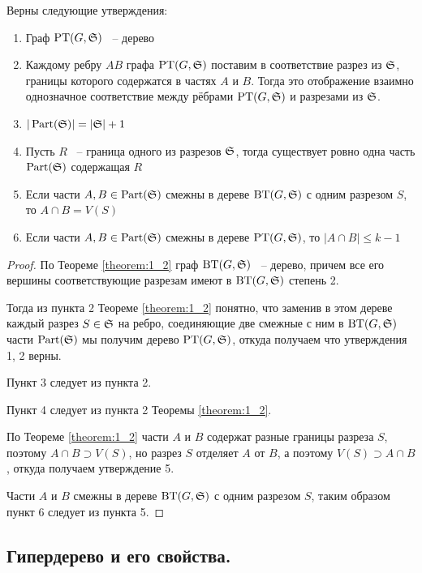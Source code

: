 \documentclass[../main.tex]{subfiles}
\begin{document}
\begin{customcrly}{1.1} \label{crly:1_1}
	Верны следующие утверждения:

	\begin{enumerate}
		\item Граф $\PT(G, \S)$ ~-- дерево 
		\item Каждому ребру $AB$ графа $\PT(G, \S)$ поставим в соответствие разрез из $\S$, границы которого содержатся в частях $A$ и $B$.
			Тогда это отображение взаимно однозначное соответствие между рёбрами $\PT(G, \S)$ и разрезами из $\S$.
		\item $|\Part(\S)| = |\S| + 1$
		\item Пусть  $R$ ~-- граница одного из разрезов $\S$, тогда существует ровно одна часть $\Part(\S)$ содержащая $R$
		\item Если части  $A, B \in \Part(\S)$ смежны в дереве $\BT(G, \S)$ с одним разрезом $S$, то $A \cap B = V(S)$
		\item Если части  $A, B \in \Part(\S)$ смежны в дереве $\PT(G, \S)$, то $|A \cap B| \leqslant k - 1$
	\end{enumerate}
 
\end{customcrly}

\begin{proof}
	По Теореме \ref{theorem:1_2} граф $\BT(G, \S)$ ~-- дерево, причем все его вершины соответствующие разрезам имеют в $\BT(G, \S)$ степень 2.

	Тогда из пункта 2 Теореме \ref{theorem:1_2} понятно, что заменив в этом дереве каждый разрез $S \in \S$ на ребро, соединяющие две смежные с ним в $\BT(G, \S)$ части $\Part(\S)$ мы получим дерево $\PT(G, \S)$, откуда получаем что утверждения 1, 2 верны.

	Пункт 3 следует из пункта 2.

	Пункт 4 следует из пункта 2 Теоремы \ref{theorem:1_2}.

	По Теореме \ref{theorem:1_2} части $A$ и $B$ содержат разные границы разреза $S$, поэтому $A \cap B \supset V(S)$, но разрез  $S$ отделяет $A$ от $B$, а поэтому $V(S) \supset A \cap B $, откуда получаем утверждение 5.

	Части $A$ и $B$ смежны в дереве $\BT(G, \S)$ с одним разрезом $S$, таким образом пункт 6 следует из пункта 5.
\end{proof}

\subsection{Гипердерево и его свойства.}
\end{document}
